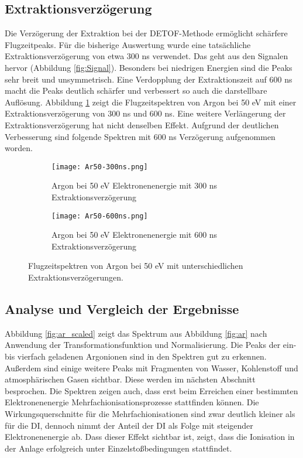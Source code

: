 \subsection{Extraktionsverzögerung}
Die Verzögerung der Extraktion bei der DETOF-Methode ermöglicht schärfere Flugzeitpeaks. Für die bisherige Auswertung wurde eine tatsächliche Extraktionsverzögerung von etwa 300 ns verwendet. Das geht aus den Signalen hervor (Abbildung \ref{fig:Signal}). Besonders bei niedrigen Energien sind die Peaks sehr breit und unsymmetrisch. Eine Verdopplung der Extraktionszeit auf 600 ns macht die Peaks deutlich schärfer und verbessert so auch die darstellbare Auflösung. Abbildung \ref{fig:delay} zeigt die Flugzeitspektren von Argon bei 50 eV mit einer Extraktionsverzögerung von 300 ns und 600 ns. Eine weitere Verlängerung der Extraktionsverzögerung hat nicht denselben Effekt. Aufgrund der deutlichen Verbesserung sind folgende Spektren mit 600 ns Verzögerung aufgenommen worden.
\begin{figure}
    \centering
    \begin{subfigure}{.7\textwidth}
        \centering
        \texttt{[image: Ar50-300ns.png]}
        \caption{Argon bei 50 eV Elektronenenergie mit 300 ns Extraktionsverzögerung}
    \end{subfigure}%
    \hfill
    \begin{subfigure}{.7\textwidth}
        \centering
        \texttt{[image: Ar50-600ns.png]}
        \caption{Argon bei 50 eV Elektronenenergie mit 600 ns Extraktionsverzögerung}
        
    \end{subfigure}
    \caption[Einfluss der Extraktionsverzögerung auf Flugzeitspektren]{Flugzeitspektren von Argon bei 50 eV mit unterschiedlichen Extraktionsverzögerungen.}
    \label{fig:delay}
\end{figure}

\subsection{Analyse und Vergleich der Ergebnisse}
Abbildung \ref{fig:ar_scaled} zeigt das Spektrum aus Abbildung \ref{fig:ar} nach Anwendung der Transformationsfunktion und Normalisierung. Die Peaks der ein- bis vierfach geladenen Argonionen sind in den Spektren gut zu erkennen. Außerdem sind einige weitere Peaks mit Fragmenten von Wasser, Kohlenstoff und atmosphärischen Gasen sichtbar. Diese werden im nächsten Abschnitt besprochen. Die Spektren zeigen auch, dass erst beim Erreichen einer bestimmten Elektronenenergie Mehrfachionisationsprozesse stattfinden können. Die Wirkungsquerschnitte für die Mehrfachionisationen sind zwar deutlich kleiner als für die DI, dennoch nimmt der Anteil der DI als Folge mit steigender Elektronenenergie ab. Dass dieser Effekt sichtbar ist, zeigt, dass die Ionisation in der Anlage erfolgreich unter Einzelstoßbedingungen stattfindet. 


